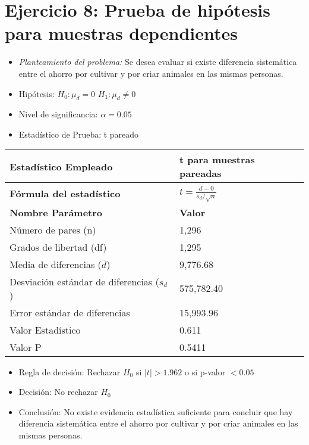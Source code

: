 \documentclass[12pt,a4paper]{article}
\begin{document}
\section*{Ejercicio 8: Prueba de hipótesis para muestras dependientes}
\begin{itemize}
    \item \textit{Planteamiento del problema:} Se desea evaluar si existe diferencia sistemática entre el ahorro por cultivar y por criar animales en las mismas personas.
    \item Hipótesis: \quad $H_{0}: \mu_d = 0$ \hspace{2cm} $H_{1}: \mu_d \neq 0$
    \item Nivel de significancia: $\alpha = 0.05$
    \item Estadístico de Prueba: t pareado
\end{itemize}

\begin{tabular}{|m{7cm}|m{7cm}|}
\hline
\textbf{Estadístico Empleado} & t para muestras pareadas \\ \hline
\textbf{Fórmula del estadístico} & $t = \frac{\bar{d} - 0}{s_d/\sqrt{n}}$ \\ \hline
\textbf{Nombre Parámetro} & \textbf{Valor} \\ \hline
Número de pares (n) & 1,296 \\ \hline
Grados de libertad (df) & 1,295 \\ \hline
Media de diferencias ($\bar{d}$) & 9,776.68 \\ \hline
Desviación estándar de diferencias ($s_d$) & 575,782.40 \\ \hline
Error estándar de diferencias & 15,993.96 \\ \hline
Valor Estadístico & 0.611 \\ \hline
Valor P & 0.5411 \\ \hline
\end{tabular}

\begin{itemize}
    \item Regla de decisión: Rechazar $H_0$ si $|t| > 1.962$ o si p-valor $< 0.05$
    \item Decisión: No rechazar $H_0$
    \item Conclusión: No existe evidencia estadística suficiente para concluir que hay diferencia sistemática entre el ahorro por cultivar y por criar animales en las mismas personas.
\end{itemize}
\end{document}
